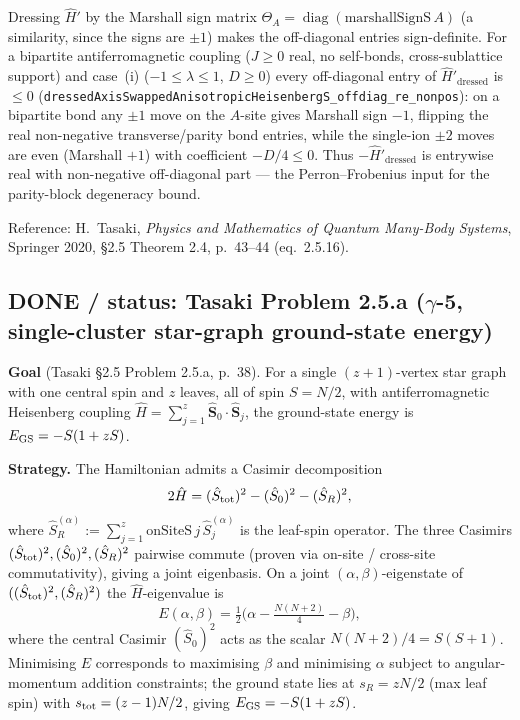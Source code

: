 \documentclass[a4paper,11pt]{article}
\begin{document}
Dressing \(\hat H'\) by the Marshall sign matrix \(\Theta_A=\operatorname{diag}(\text{marshallSignS}\,A)\)
(a similarity, since the signs are \(\pm1\)) makes the off-diagonal entries
sign-definite.  For a bipartite antiferromagnetic coupling (\(J\ge0\) real, no
self-bonds, cross-sublattice support) and case~(i) (\(-1\le\lambda\le1\),
\(D\ge0\)) every off-diagonal entry of \(\hat H'_{\mathrm{dressed}}\) is
\(\le0\) (\texttt{dressedAxisSwappedAnisotropicHeisenbergS\_offdiag\_re\_nonpos}):
on a bipartite bond any \(\pm1\) move on the \(A\)-site gives Marshall sign
\(-1\), flipping the real non-negative transverse/parity bond entries, while the
single-ion \(\pm2\) moves are even (Marshall \(+1\)) with coefficient
\(-D/4\le0\).  Thus \(-\hat H'_{\mathrm{dressed}}\) is entrywise real with
non-negative off-diagonal part --- the Perron--Frobenius input for the
parity-block degeneracy bound.

Reference: H.\ Tasaki, \emph{Physics and Mathematics of Quantum
Many-Body Systems}, Springer 2020, §2.5 Theorem 2.4, p.~43--44 (eq.~2.5.16).

\subsection*{DONE / status: Tasaki Problem 2.5.a ($\gamma$-5,
                single-cluster star-graph ground-state energy)}
\label{subsec:tasaki-problem-2-5-a}

\textbf{Goal} (Tasaki §2.5 Problem 2.5.a, p.~38). For a single
$(z+1)$-vertex star graph with one central spin and $z$ leaves, all of
spin $S = N/2$, with antiferromagnetic Heisenberg coupling
$\hat H = \sum_{j=1}^{z} \hat{\boldsymbol S}_0 \cdot
\hat{\boldsymbol S}_j$, the ground-state energy is
$E_{\rm GS} = -S(1 + zS)$.

\textbf{Strategy.} The Hamiltonian admits a Casimir decomposition
\[
  2 \hat H = (\hat S_{\rm tot})^2 - (\hat S_0)^2 - (\hat S_R)^2,
\]
where $\hat S_R^{(\alpha)} := \sum_{j=1}^{z}
\mathrm{onSiteS}\,j\,\hat S_j^{(\alpha)}$ is the leaf-spin operator.
The three Casimirs $(\hat S_{\rm tot})^2, (\hat S_0)^2,
(\hat S_R)^2$ pairwise commute (proven via on-site / cross-site
commutativity), giving a joint eigenbasis. On a joint
$(\alpha, \beta)$-eigenstate of $((\hat S_{\rm tot})^2,
(\hat S_R)^2)$ the $\hat H$-eigenvalue is
\[
  E(\alpha, \beta) = \tfrac{1}{2}\bigl(\alpha
    - \tfrac{N(N+2)}{4} - \beta\bigr),
\]
where the central Casimir $(\hat S_0)^2$ acts as the scalar
$N(N+2)/4 = S(S+1)$. Minimising $E$ corresponds to maximising
$\beta$ and minimising $\alpha$ subject to angular-momentum
addition constraints; the ground state lies at $s_R = z N/2$ (max
leaf spin) with $s_{\rm tot} = (z-1)N/2$, giving
$E_{\rm GS} = -S(1 + zS)$.
\end{document}
